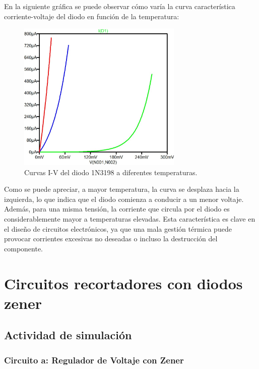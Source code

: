 \documentclass[chaptersright]{informeutn}
\begin{document}
    En la siguiente gráfica se puede observar cómo varía la curva característica corriente-voltaje del diodo en función de
    la temperatura:
    
    \begin{figure}[H]
        \centering
        \includegraphics[width=0.7\textwidth]{pictures/comparacion_temperatura_grafico.jpeg}
        \caption{Curvas I-V del diodo 1N3198 a diferentes temperaturas.}
    \end{figure}
    
    Como se puede apreciar, a mayor temperatura, la curva se desplaza hacia la izquierda, lo que indica que el diodo
    comienza a conducir a un menor voltaje. Además, para una misma tensión, la corriente que circula por el diodo es
    considerablemente mayor a temperaturas elevadas. Esta característica es clave en el diseño de circuitos electrónicos, 
    ya que una mala gestión térmica puede provocar corrientes excesivas no deseadas o incluso la destrucción del componente.


\chapter{Circuitos recortadores con diodos zener}

\section{Actividad de simulación}

\subsection*{Circuito a: Regulador de Voltaje con Zener}
\end{document}
